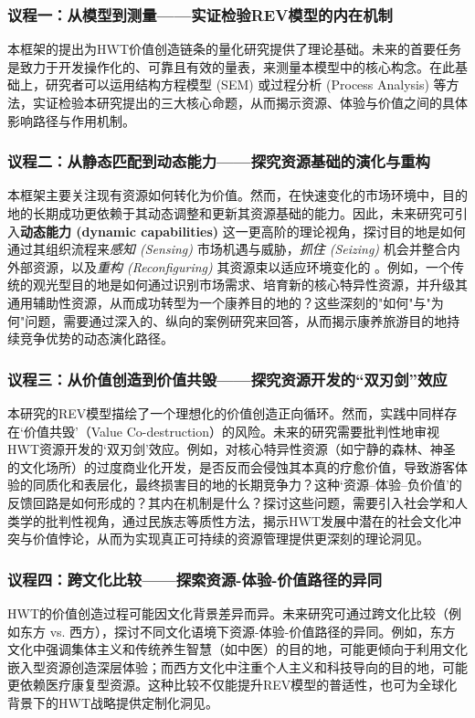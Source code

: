 \documentclass[UTF8, 12pt, a4paper, twoside]{ctexart}
\begin{document}
\subsubsection{议程一：从模型到测量——实证检验REV模型的内在机制}
本框架的提出为HWT价值创造链条的量化研究提供了理论基础。未来的首要任务是致力于开发操作化的、可靠且有效的量表，来测量本模型中的核心构念。在此基础上，研究者可以运用结构方程模型 (SEM) 或过程分析 (Process Analysis) 等方法，实证检验本研究提出的三大核心命题，从而揭示资源、体验与价值之间的具体影响路径与作用机制。

\subsubsection{议程二：从静态匹配到动态能力——探究资源基础的演化与重构}
本框架主要关注现有资源如何转化为价值。然而，在快速变化的市场环境中，目的地的长期成功更依赖于其动态调整和更新其资源基础的能力。因此，未来研究可引入\textbf{动态能力 (dynamic capabilities)} 这一更高阶的理论视角，探讨目的地是如何通过其组织流程来\textit{感知 (Sensing)} 市场机遇与威胁，\textit{抓住 (Seizing)} 机会并整合内外部资源，以及\textit{重构 (Reconfiguring)} 其资源束以适应环境变化的 \parencite{teece2007dynamic}。例如，一个传统的观光型目的地是如何通过识别市场需求、培育新的核心特异性资源，并升级其通用辅助性资源，从而成功转型为一个康养目的地的？这些深刻的"如何"与"为何"问题，需要通过深入的、纵向的案例研究来回答，从而揭示康养旅游目的地持续竞争优势的动态演化路径。

\subsubsection{议程三：从价值创造到价值共毁——探究资源开发的“双刃剑”效应}
本研究的REV模型描绘了一个理想化的价值创造正向循环。然而，实践中同样存在‘价值共毁’（Value Co-destruction）的风险。未来的研究需要批判性地审视HWT资源开发的‘双刃剑’效应。例如，对核心特异性资源（如宁静的森林、神圣的文化场所）的过度商业化开发，是否反而会侵蚀其本真的疗愈价值，导致游客体验的同质化和表层化，最终损害目的地的长期竞争力？这种‘资源--体验--负价值’的反馈回路是如何形成的？其内在机制是什么？探讨这些问题，需要引入社会学和人类学的批判性视角，通过民族志等质性方法，揭示HWT发展中潜在的社会文化冲突与价值悖论，从而为实现真正可持续的资源管理提供更深刻的理论洞见。

\subsubsection{议程四：跨文化比较——探索资源-体验-价值路径的异同}
HWT的价值创造过程可能因文化背景差异而异。未来研究可通过跨文化比较（例如东方 vs. 西方），探讨不同文化语境下资源-体验-价值路径的异同。例如，东方文化中强调集体主义和传统养生智慧（如中医）的目的地，可能更倾向于利用文化嵌入型资源创造深层体验；而西方文化中注重个人主义和科技导向的目的地，可能更依赖医疗康复型资源。这种比较不仅能提升REV模型的普适性，也可为全球化背景下的HWT战略提供定制化洞见。
\end{document}
